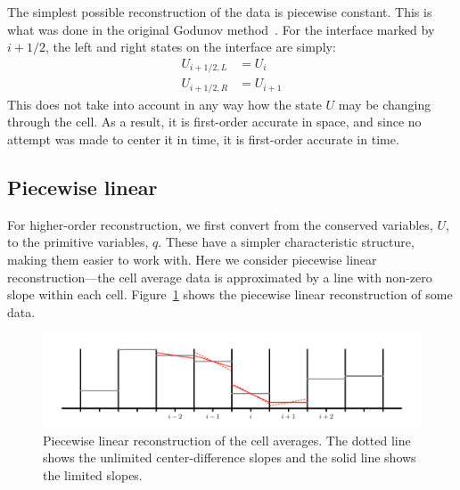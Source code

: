The simplest possible reconstruction of the data is piecewise constant.
This is what was done in the original Godunov method~\cite{godunov:1959}.  For the interface
marked by $i+1/2$, the left and right states on the interface are simply:
\begin{align}
U_{i+1/2,L} &= U_i \\
U_{i+1/2,R} &= U_{i+1}
\end{align}
This does not take into account in any way how the state $U$ may be changing
through the cell.  As a result, it is first-order accurate in space, and since
no attempt was made to center it in time, it is first-order accurate in time.

\subsection{Piecewise linear}

For higher-order reconstruction, we first convert from the conserved
variables, $U$, to the primitive variables, $q$.  These have a simpler
characteristic structure, making them easier to work with.  Here we
consider piecewise linear reconstruction---the cell average data is
approximated by a line with non-zero slope within each cell.
Figure~\ref{fig:plm} shows the piecewise linear reconstruction of some
data.


\begin{figure}[t]
\centering
\includegraphics[width=\linewidth]{piecewise-linear}
\caption[Piecewise linear reconstruction of cell average
  data]{\label{fig:plm} Piecewise linear reconstruction of the cell
  averages.  The dotted line shows the unlimited center-difference
  slopes and the solid line shows the limited slopes.}
\end{figure}

